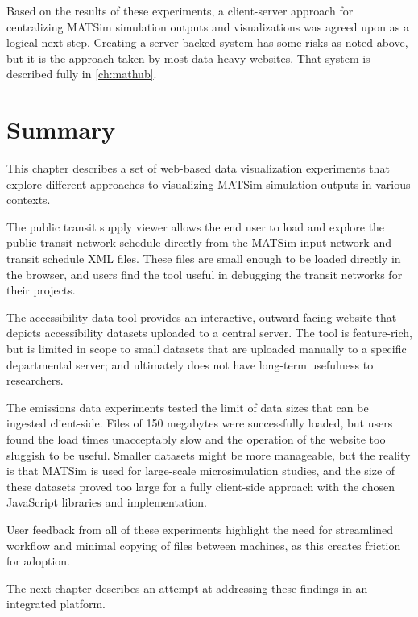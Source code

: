 Based on the results of these experiments, a client-server approach for centralizing MATSim simulation outputs and visualizations was agreed upon as a logical next step. Creating a server-backed system has some risks as noted above, but it is the approach taken by most data-heavy websites. That system is described fully in \autoref{ch:mathub}.

\hypertarget{server-experiments-summary}{%
\section{Summary}\label{server-experiments-summary}}

This chapter describes a set of web-based data visualization experiments that explore different approaches to visualizing MATSim simulation outputs in various contexts.

The public transit supply viewer allows the end user to load and explore the public transit network schedule directly from the MATSim input network and transit schedule XML files. These files are small enough to be loaded directly in the browser, and users find the tool useful in debugging the transit networks for their projects.

The accessibility data tool provides an interactive, outward-facing website that depicts accessibility datasets uploaded to a central server. The tool is feature-rich, but is limited in scope to small datasets that are uploaded manually to a specific departmental server; and ultimately does not have long-term usefulness to researchers.

The emissions data experiments tested the limit of data sizes that can be ingested client-side. Files of 150 megabytes were successfully loaded, but users found the load times unacceptably slow and the operation of the website too sluggish to be useful. Smaller datasets might be more manageable, but the reality is that MATSim is used for large-scale microsimulation studies, and the size of these datasets proved too large for a fully client-side approach with the chosen JavaScript libraries and implementation.

User feedback from all of these experiments highlight the need for streamlined workflow and minimal copying of files between machines, as this creates friction for adoption.

The next chapter describes an attempt at addressing these findings in an integrated platform.

